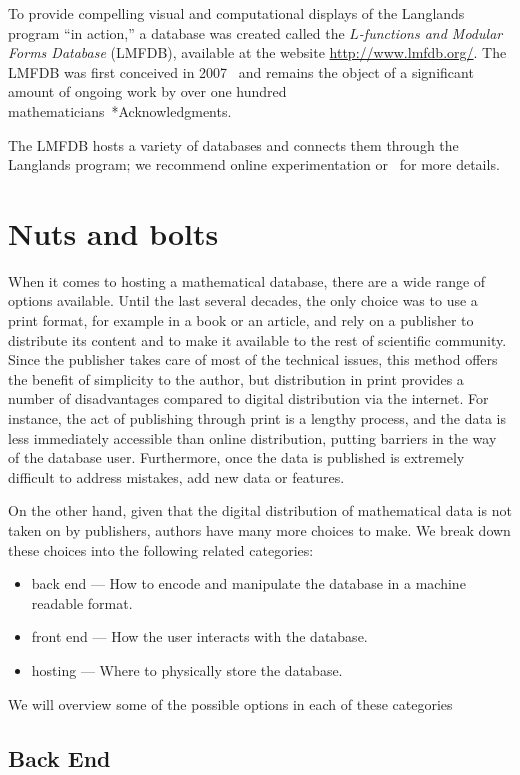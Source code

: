 \documentclass{amsart}
\begin{document}
To provide compelling visual and computational displays of the Langlands program ``in action,'' a database was created called the \emph{$L$-functions and Modular Forms Database} (LMFDB), available at the website \url{http://www.lmfdb.org/}.
The LMFDB was first conceived in 2007~\cite{cremona-16} and remains the object of a significant amount of ongoing work by over one hundred mathematicians~\cite{lmfdb}*{Acknowledgments}.

The LMFDB hosts a variety of databases and connects them through the Langlands program; we recommend online experimentation or~\cite{cremona-16} for more details.


\section{Nuts and bolts}
\label{sec:nutsbolts}

When it comes to hosting a mathematical database, there are a wide range of options available.
Until the last several decades, the only choice was to use a print format, for example in a book or an article, and rely on a publisher to distribute its content and to make it available to the rest of scientific community.
Since the publisher takes care of most of the technical issues, this method offers the benefit of simplicity to the author, but distribution in print provides a number of disadvantages compared to digital distribution via the internet.
For instance, the act of publishing through print is a lengthy process, and the data is less immediately accessible than online distribution, putting barriers in the way of the database user.
Furthermore, once the data is published is extremely difficult to address  mistakes, add new data or features.

On the other hand, given that the digital distribution of mathematical data is not taken on by publishers, authors have many more choices to make.
We break down these choices into the following related categories:
\begin{itemize}
  \item back end --- How to encode and manipulate the database in a machine readable format.
  \item front end --- How the user interacts with the database.
  \item hosting --- Where to physically store the database.
\end{itemize}
We will overview some of the possible options in each of these categories

\subsection{Back End}
\end{document}
